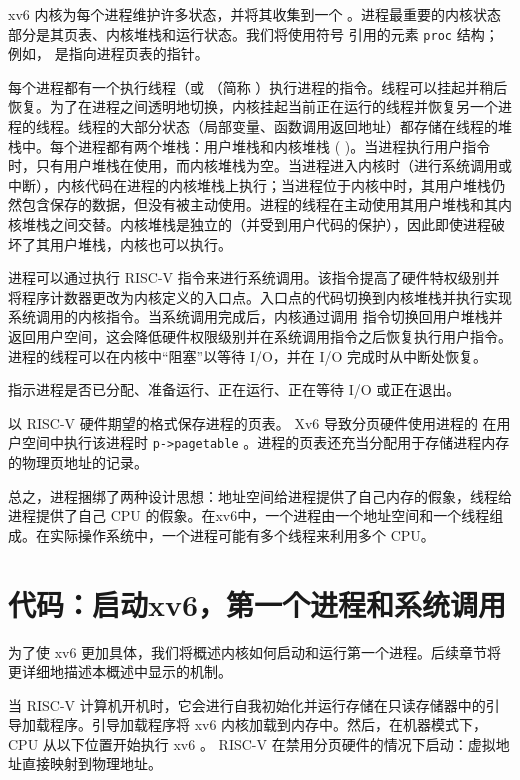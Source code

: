 \documentclass[UTF8]{article}
\begin{document}
xv6 内核为每个进程维护许多状态，并将其收集到一个
        。进程最重要的内核状态部分是其页表、内核堆栈和运行状态。我们将使用符号
        引用的元素
    \lstinline{proc}   结构；例如，
        是指向进程页表的指针。  

每个进程都有一个执行线程（或
       （简称      ）执行进程的指令。线程可以挂起并稍后恢复。为了在进程之间透明地切换，内核挂起当前正在运行的线程并恢复另一个进程的线程。线程的大部分状态（局部变量、函数调用返回地址）都存储在线程的堆栈中。每个进程都有两个堆栈：用户堆栈和内核堆栈 (        )。当进程执行用户指令时，只有用户堆栈在使用，而内核堆栈为空。当进程进入内核时（进行系统调用或中断），内核代码在进程的内核堆栈上执行；当进程位于内核中时，其用户堆栈仍然包含保存的数据，但没有被主动使用。进程的线程在主动使用其用户堆栈和其内核堆栈之间交替。内核堆栈是独立的（并受到用户代码的保护），因此即使进程破坏了其用户堆栈，内核也可以执行。  

进程可以通过执行 RISC-V        指令来进行系统调用。该指令提高了硬件特权级别并将程序计数器更改为内核定义的入口点。入口点的代码切换到内核堆栈并执行实现系统调用的内核指令。当系统调用完成后，内核通过调用      指令切换回用户堆栈并返回用户空间，这会降低硬件权限级别并在系统调用指令之后恢复执行用户指令。进程的线程可以在内核中“阻塞”以等待 I/O，并在 I/O 完成时从中断处恢复。  

       指示进程是否已分配、准备运行、正在运行、正在等待 I/O 或正在退出。  

       以 RISC-V 硬件期望的格式保存进程的页表。 Xv6 导致分页硬件使用进程的
 在用户空间中执行该进程时    \lstinline{p->pagetable}   。进程的页表还充当分配用于存储进程内存的物理页地址的记录。  

总之，进程捆绑了两种设计思想：地址空间给进程提供了自己内存的假象，线程给进程提供了自己 CPU 的假象。在xv6中，一个进程由一个地址空间和一个线程组成。在实际操作系统中，一个进程可能有多个线程来利用多个 CPU。
    \section{代码：启动xv6，第一个进程和系统调用  }    为了使 xv6 更加具体，我们将概述内核如何启动和运行第一个进程。后续章节将更详细地描述本概述中显示的机制。  

当 RISC-V 计算机开机时，它会进行自我初始化并运行存储在只读存储器中的引导加载程序。引导加载程序将 xv6 内核加载到内存中。然后，在机器模式下，CPU 从以下位置开始执行 xv6
        。 RISC-V 在禁用分页硬件的情况下启动：虚拟地址直接映射到物理地址。  
\end{document}
